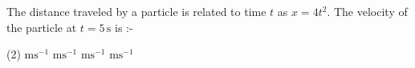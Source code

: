 \item The distance traveled by a particle is related to time $t$ as $x = 4t^2$. The velocity of the particle at $t = 5\, \mathrm{s}$ is :-
    \begin{tasks}(2)
         $\mathrm{ms^{-1}}$
         $\mathrm{ms^{-1}}$
         $\mathrm{ms^{-1}}$
         $\mathrm{ms^{-1}}$
    \end{tasks}